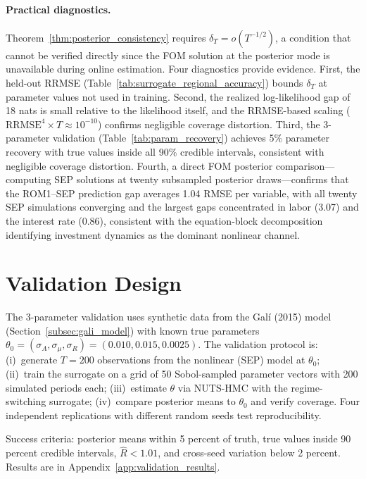 \documentclass[12pt]{article}
\theoremstyle{plain}
\theoremstyle{definition}
\theoremstyle{remark}
\begin{document}
\paragraph{Practical diagnostics.}
Theorem~\ref{thm:posterior_consistency} requires $\delta_T = o(T^{-1/2})$, a condition that cannot be verified directly since the FOM solution at the posterior mode is unavailable during online estimation. Four diagnostics provide evidence. First, the held-out RRMSE (Table~\ref{tab:surrogate_regional_accuracy}) bounds $\delta_T$ at parameter values not used in training. Second, the realized log-likelihood gap of 18 nats is small relative to the likelihood itself, and the RRMSE-based scaling ($\text{RRMSE}^4 \times T \approx 10^{-10}$) confirms negligible coverage distortion. Third, the 3-parameter validation (Table~\ref{tab:param_recovery}) achieves 5\% parameter recovery with true values inside all 90\% credible intervals, consistent with negligible coverage distortion. Fourth, a direct FOM posterior comparison---computing SEP solutions at twenty subsampled posterior draws---confirms that the ROM1--SEP prediction gap averages 1.04 RMSE per variable, with all twenty SEP simulations converging and the largest gaps concentrated in labor (3.07) and the interest rate (0.86), consistent with the equation-block decomposition identifying investment dynamics as the dominant nonlinear channel.


\section{Validation Design}
\label{sec:validation_design}

The 3-parameter validation uses synthetic data from the Gal\'i (2015) model (Section~\ref{subsec:gali_model}) with known true parameters $\theta_0 = (\sigma_A, \sigma_\mu, \sigma_R) = (0.010, 0.015, 0.0025)$. The validation protocol is: (i)~generate $T=200$ observations from the nonlinear (SEP) model at $\theta_0$; (ii)~train the surrogate on a grid of 50 Sobol-sampled parameter vectors with 200 simulated periods each; (iii)~estimate $\theta$ via NUTS-HMC with the regime-switching surrogate; (iv)~compare posterior means to $\theta_0$ and verify coverage. Four independent replications with different random seeds test reproducibility.

Success criteria: posterior means within 5 percent of truth, true values inside 90 percent credible intervals, $\hat{R} < 1.01$, and cross-seed variation below 2 percent. Results are in Appendix~\ref{app:validation_results}.
\end{document}
